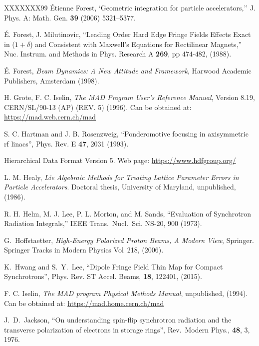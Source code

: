 \begin{thebibliography}{XXXXXXX99}
\'Etienne Forest, `Geometric integration for particle accelerators,''
J. Phys. A: Math. Gen. {\bf 39} (2006) 5321–5377.

\'E. Forest, J. Milutinovic, 
``Leading Order Hard Edge Fringe Fields Effects Exact in ($1+\delta$) and 
Consistent with Maxwell's Equations for Rectilinear Magnets,''
Nuc. Instrum. and Methods in Phys. Research A {\bf 269}, pp 474-482, (1988).

\'E. Forest, {\em Beam Dynamics: A New Attitude and Framework},
Harwood Academic Publishers, Amsterdam (1998).

H. Grote, F. C. Iselin, {\it The MAD Program User's Reference Manual},
Version 8.19, CERN/SL/90-13 (AP) (REV. 5) (1996). 
Can be obtained at:
\hfill\break
\hspace*{0.3in}
\url{https://mad.web.cern.ch/mad} 

S. C. Hartman and J. B. Rosenzweig, 
``Ponderomotive focusing in axisymmetric rf linacs'',
Phys. Rev. E {\bf 47}, 2031 (1993).

Hierarchical Data Format Version 5. Web page:
\hfill\break
\hspace*{0.3in} \url{https://www.hdfgroup.org/}

L. M. Healy, {\it Lie Algebraic Methods for Treating Lattice Parameter
Errors in Particle Accelerators}. Doctoral thesis, University of
Maryland, unpublished, (1986).

R. H. Helm, M. J. Lee, P. L. Morton, and M. Sands, 
``Evaluation of Synchrotron Radiation Integrals,''
IEEE Trans.~Nucl.~Sci. NS-20, 900 (1973).

G.~Hoffstaetter, 
{\it High-Energy Polarized Proton Beams, A Modern View}, 
Springer. Springer Tracks in Modern Physics Vol~218, (2006).

K.~Hwang and S.~Y.~Lee, 
``Dipole Fringe Field Thin Map for Compact Synchrotrons'',
Phys. Rev. ST Accel. Beams, {\bf 18}, 122401, (2015).

F. C. Iselin, 
{\it The MAD program Physical Methods Manual}, 
unpublished, (1994). Can be obtained at: 
\hfill\break
\hspace*{0.3in}
\url{https://mad.home.cern.ch/mad}

J.~D.~Jackson,
``On understanding spin-flip synchrotron radiation and the transverse 
polarization of electrons in storage rings'',
Rev.\ Modern Phys., {\bf 48}, 3, 1976.


\end{thebibliography}
